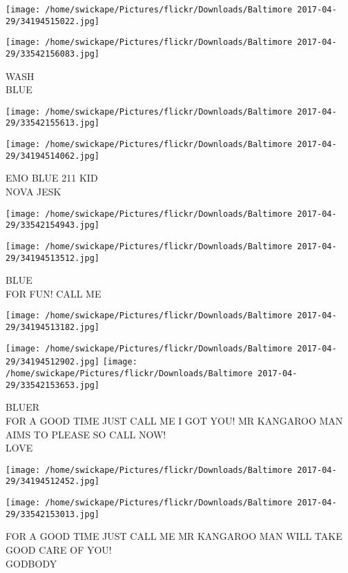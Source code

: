 \documentclass[10pt,letterpaper]{article}
\begin{document}
\texttt{[image: /home/swickape/Pictures/flickr/Downloads/Baltimore 2017-04-29/34194515022.jpg]}

\vspace{0.25in}
\texttt{[image: /home/swickape/Pictures/flickr/Downloads/Baltimore 2017-04-29/33542156083.jpg]}

WASH\\
BLUE
\pagebreak

\texttt{[image: /home/swickape/Pictures/flickr/Downloads/Baltimore 2017-04-29/33542155613.jpg]}

\vspace{0.25in}
\texttt{[image: /home/swickape/Pictures/flickr/Downloads/Baltimore 2017-04-29/34194514062.jpg]}

EMO BLUE 211 KID\\
NOVA JESK
\pagebreak

\texttt{[image: /home/swickape/Pictures/flickr/Downloads/Baltimore 2017-04-29/33542154943.jpg]}

\vspace{0.25in}
\texttt{[image: /home/swickape/Pictures/flickr/Downloads/Baltimore 2017-04-29/34194513512.jpg]}

BLUE\\
FOR FUN!  CALL ME
\pagebreak

\texttt{[image: /home/swickape/Pictures/flickr/Downloads/Baltimore 2017-04-29/34194513182.jpg]}

\vspace{0.25in}
\texttt{[image: /home/swickape/Pictures/flickr/Downloads/Baltimore 2017-04-29/34194512902.jpg]}
\texttt{[image: /home/swickape/Pictures/flickr/Downloads/Baltimore 2017-04-29/33542153653.jpg]}

BLUER\\
FOR A GOOD TIME JUST CALL ME I GOT YOU!  MR KANGAROO MAN AIMS TO PLEASE SO CALL NOW!\\
LOVE
\pagebreak

\texttt{[image: /home/swickape/Pictures/flickr/Downloads/Baltimore 2017-04-29/34194512452.jpg]}

\vspace{0.25in}
\texttt{[image: /home/swickape/Pictures/flickr/Downloads/Baltimore 2017-04-29/33542153013.jpg]}

FOR A GOOD TIME JUST CALL ME MR KANGAROO MAN WILL TAKE GOOD CARE OF YOU!\\
GODBODY
\pagebreak
\end{document}
